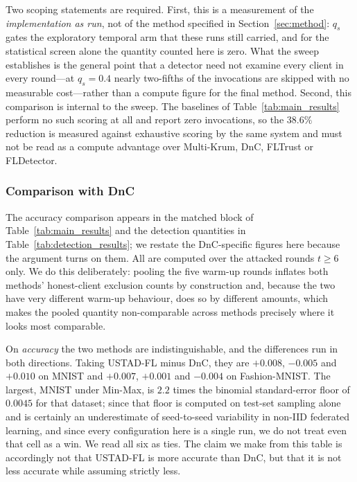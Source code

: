 \documentclass[journal]{IEEEtran}
\begin{document}
Two scoping statements are required. First, this is a measurement of the \emph{implementation
as run}, not of the method specified in Section~\ref{sec:method}: $q_s$ gates the exploratory
temporal arm that these runs still carried, and for the statistical screen alone the quantity
counted here is zero. What the sweep establishes is the general point that a detector need
not examine every client in every round---at $q_s = 0.4$ nearly two-fifths of the invocations
are skipped with no measurable cost---rather than a compute figure for the final method.
Second, this comparison is internal to the sweep. The baselines of
Table~\ref{tab:main_results} perform no such scoring at all and report zero invocations, so
the $38.6\%$ reduction is measured against exhaustive scoring by the same system and must not
be read as a compute advantage over Multi-Krum, DnC, FLTrust or FLDetector.

\subsubsection{Comparison with DnC}
The accuracy comparison appears in the matched block of Table~\ref{tab:main_results} and the detection quantities in Table~\ref{tab:detection_results}; we restate the DnC-specific figures here because the argument turns on them. All are computed over the attacked rounds $t \ge 6$ only. We do this deliberately: pooling the five warm-up rounds inflates both methods' honest-client exclusion counts by construction and, because the two have very different warm-up behaviour, does so by different amounts, which makes the pooled quantity non-comparable across methods precisely where it looks most comparable.

On \emph{accuracy} the two methods are indistinguishable, and the differences run in both directions. Taking USTAD-FL minus DnC, they are $+0.008$, $-0.005$ and $+0.010$ on MNIST and $+0.007$, $+0.001$ and $-0.004$ on Fashion-MNIST. The largest, MNIST under Min-Max, is $2.2$ times the binomial standard-error floor of $0.0045$ for that dataset; since that floor is computed on test-set sampling alone and is certainly an underestimate of seed-to-seed variability in non-IID federated learning, and since every configuration here is a single run, we do not treat even that cell as a win. We read all six as ties. The claim we make from this table is accordingly not that USTAD-FL is more accurate than DnC, but that it is not less accurate while assuming strictly less.
\end{document}
